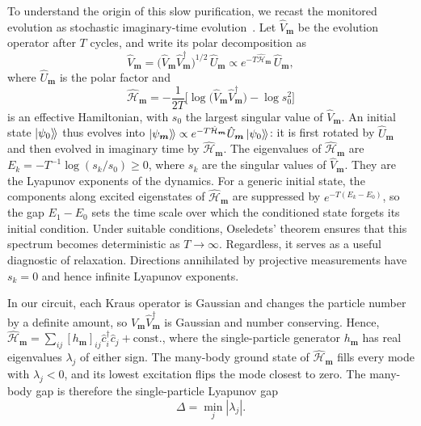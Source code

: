 \documentclass[aps,prb,twocolumn,superscriptaddress,longbibliography,floatfix]{revtex4-2}
\newcommand{\mc}[1]{\mathcal{#1}}
\newcommand{\bs}[1]{\boldsymbol{#1}}
\newcommand{\kett}[1]{\ket{#1}\!\rangle}
\newcommand{\rec}{\bs m}   %
\begin{document}
To understand the origin of this slow purification, we recast the monitored evolution as stochastic imaginary-time evolution~\cite{Oshima2025,XiaoKawabata2026,yamamoto2026measurement}. Let $\hat V_{\rec}$ be the evolution operator after $T$ cycles, and write its polar decomposition as
\begin{equation}
    \hat V_{\rec}=\big(\hat V_{\rec}\hat V_{\rec}^\dagger\big)^{1/2}\,\hat U_{\rec}\propto e^{-T\hat{\mc H}_{\rec}}\,\hat U_{\rec},
    \label{eq:PolarDecomposition}
\end{equation}
where $\hat U_{\rec}$ is the polar factor and
\begin{equation}
    \hat{\mc H}_{\rec}=-\frac{1}{2T}\Big[\log\big(\hat V_{\rec}\hat V_{\rec}^\dagger\big)-\log s_0^2\Big]
    \label{eq:EffectiveHamiltonian}
\end{equation}
is an effective Hamiltonian, with $s_0$ the largest singular value of $\hat V_{\rec}$. An initial state $\kett{\psi_0}$ thus evolves into $\kett{\psi_{\rec}}\propto e^{-T\hat{\mc H}_{\rec}}\hat U_{\rec}\kett{\psi_0}$: it is first rotated by $\hat U_{\rec}$ and then evolved in imaginary time by $\hat{\mc H}_{\rec}$. The eigenvalues of $\hat{\mc H}_{\rec}$ are $E_k=-T^{-1}\log(s_k/s_0)\geq0$, where $s_k$ are the singular values of $\hat V_{\rec}$. They are the Lyapunov exponents of the dynamics. For a generic initial state, the components along excited eigenstates of $\hat{\mc H}_{\rec}$ are suppressed by $e^{-T(E_k-E_0)}$, so the gap $E_1-E_0$ sets the time scale over which the conditioned state forgets its initial condition. Under suitable conditions, Oseledets' theorem ensures that this spectrum becomes deterministic as $T\to\infty$. Regardless, it serves as a useful diagnostic of relaxation. Directions annihilated by projective measurements have $s_k=0$ and hence infinite Lyapunov exponents.

In our circuit, each Kraus operator is Gaussian and changes the particle number by a definite amount, so $\hat V_{\rec}\hat V_{\rec}^\dagger$ is Gaussian and number conserving. Hence, $\hat{\mc H}_{\rec}=\sum_{ij}[h_{\rec}]_{ij}\hat c^\dagger_i\hat c_j+\text{const.}$, where the single-particle generator $h_{\rec}$ has real eigenvalues $\lambda_j$ of either sign. The many-body ground state of $\hat{\mc H}_{\rec}$ fills every mode with $\lambda_j<0$, and its lowest excitation flips the mode closest to zero. The many-body gap is therefore the single-particle Lyapunov gap
\begin{equation}
    \Delta=\min_j|\lambda_j|.
    \label{eq:LyapunovGap}
\end{equation}
\end{document}
